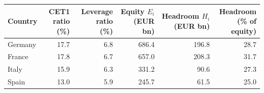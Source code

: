 \begin{tabular*}{\textwidth}{@{\extracolsep{\fill}}lrrrrr@{}}
\toprule
Country & \shortstack{CET1 ratio\\(\%)} & \shortstack{Leverage ratio\\(\%)} & \shortstack{Equity $E_i$\\(EUR bn)} & \shortstack{Headroom $H_i$\\(EUR bn)} & \shortstack{Headroom\\(\% of equity)} \\
\midrule
Germany & 17.7 & 6.8 & 686.4 & 196.8 & 28.7 \\
France & 17.8 & 6.7 & 657.0 & 208.3 & 31.7 \\
Italy & 15.9 & 6.3 & 331.2 & 90.6 & 27.3 \\
Spain & 13.0 & 5.9 & 245.7 & 61.5 & 25.0 \\
\bottomrule
\end{tabular*}
